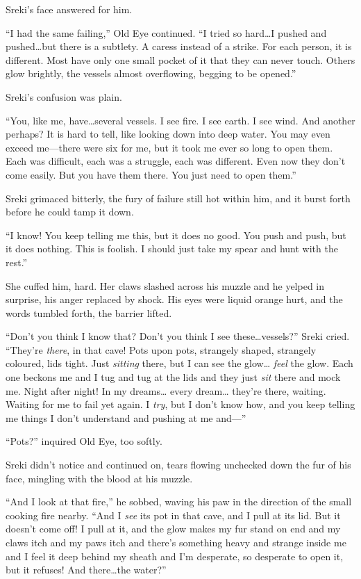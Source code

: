 Sreki's face answered for him.

``I had the same failing,'' Old Eye continued. ``I tried so hard\ldots{}I pushed and pushed\ldots{}but there is a subtlety. A caress instead of a strike. For each person, it is different. Most have only one small pocket of it that they can never touch. Others glow brightly, the vessels almost overflowing, begging to be opened.''

Sreki's confusion was plain.

``You, like me, have\ldots{}several vessels. I see fire. I see earth. I see wind. And another perhaps? It is hard to tell, like looking down into deep water. You may even exceed me---there were six for me, but it took me ever so long to open them. Each was difficult, each was a struggle, each was different. Even now they don't come easily. But you have them there. You just need to open them.''

Sreki grimaced bitterly, the fury of failure still hot within him, and it burst forth before he could tamp it down.

``I know! You keep telling me this, but it does no good. You push and push, but it does nothing. This is foolish. I should just take my spear and hunt with the rest.''

She cuffed him, hard. Her claws slashed across his muzzle and he yelped in surprise, his anger replaced by shock. His eyes were liquid orange hurt, and the words tumbled forth, the barrier lifted.

``Don't you think I know that? Don't you think I see these\ldots{}vessels?'' Sreki cried. ``They're \emph{there}, in that cave! Pots upon pots, strangely shaped, strangely coloured, lids tight. Just \emph{sitting} there, but I can see the glow\ldots{} \emph{feel} the glow. Each one beckons me and I tug and tug at the lids and they just \emph{sit} there and mock me. Night after night! In my dreams\ldots{} every dream\ldots{} they're there, waiting. Waiting for me to fail yet again. I \emph{try}, but I don't know how, and you keep telling me things I don't understand and pushing at me and---''

``Pots?'' inquired Old Eye, too softly.

Sreki didn't notice and continued on, tears flowing unchecked down the fur of his face, mingling with the blood at his muzzle.

``And I look at that fire,'' he sobbed, waving his paw in the direction of the small cooking fire nearby. ``And I \emph{see} its pot in that cave, and I pull at its lid. But it doesn't come off! I pull at it, and the glow makes my fur stand on end and my claws itch and my paws itch and there's something heavy and strange inside me and I feel it deep behind my sheath and I'm desperate, so desperate to open it, but it refuses! And there\ldots{}the water?''

